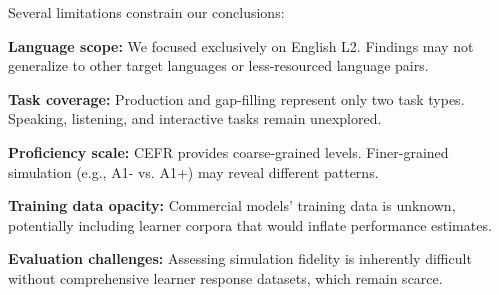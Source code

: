 Several limitations constrain our conclusions:

\textbf{Language scope:} We focused exclusively on English L2. Findings may not generalize to other target languages or less-resourced language pairs.

\textbf{Task coverage:} Production and gap-filling represent only two task types. Speaking, listening, and interactive tasks remain unexplored.

\textbf{Proficiency scale:} CEFR provides coarse-grained levels. Finer-grained simulation (e.g., A1- vs. A1+) may reveal different patterns.

\textbf{Training data opacity:} Commercial models' training data is unknown, potentially including learner corpora that would inflate performance estimates.

\textbf{Evaluation challenges:} Assessing simulation fidelity is inherently difficult without comprehensive learner response datasets, which remain scarce.
